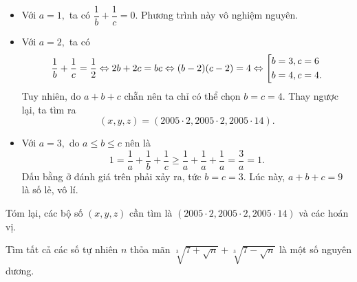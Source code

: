 \begin{gbtt}
{\begin{enumerate}
\begin{itemize}
        \item Với $a=1,$ ta có $\dfrac{1}{b}+\dfrac{1}{c}=0.$ Phương trình này vô nghiệm nguyên.
        \item Với $a=2,$ ta có $$\dfrac{1}{b}+\dfrac{1}{c}=\dfrac{1}{2}
        \Leftrightarrow 2b+2c=bc
        \Leftrightarrow (b-2)(c-2)=4
        \Leftrightarrow \left[\begin{aligned}&b=3,c=6  \\
             &b=4,c=4.\end{aligned}\right. $$
        Tuy nhiên, do $a+b+c$ chẵn nên ta chỉ có thể chọn $b=c=4.$ Thay ngược lại, ta tìm ra $$(x,y,z)=(2005\cdot 2,2005\cdot 2,2005\cdot 14).$$
        \item Với $a=3,$ do $a\le b\le c$ nên là
        $$1=\dfrac{1}{a}+\dfrac{1}{b}+\dfrac{1}{c}\ge\dfrac{1}{a}+\dfrac{1}{a}+\dfrac{1}{a}=\dfrac{3}{a}=1.$$
        Dấu bằng ở đánh giá trên phải xảy ra, tức $b=c=3.$ Lúc này, $a+b+c=9$ là số lẻ, vô lí.
    \end{itemize}
\end{enumerate}
Tóm lại, các bộ số $(x,y,z)$ cần tìm là $(2005\cdot 2,2005\cdot 2,2005\cdot 14)$ và các hoán vị.}
\end{gbtt}

\begin{gbtt}
Tìm tất cả các số tự nhiên $n$ thỏa mãn $\sqrt[3]{7+\sqrt{n}}+\sqrt[3]{7-\sqrt{n}}$
là một số nguyên dương.
\end{gbtt}


